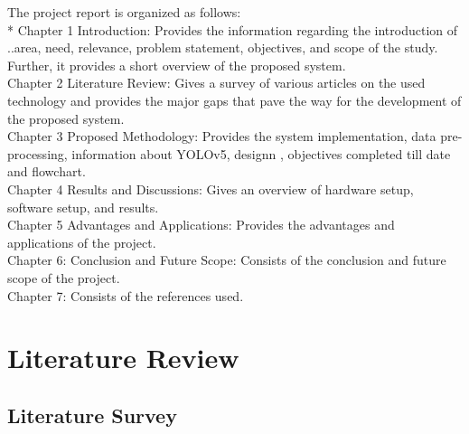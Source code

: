 \documentclass[12pt,a4paper]{report}
\begin{document}
\par The project report is organized as follows:
\\* Chapter 1 Introduction: Provides the information regarding the introduction of ..area, need, relevance, problem statement, objectives, and scope of the study. Further, it provides a short overview of the proposed system.
\\
Chapter 2 Literature Review: Gives a survey of various articles on the used technology and provides the major gaps that pave the way for the development of the proposed system.
\\
Chapter 3 Proposed Methodology: Provides the system implementation, data pre-processing, information about YOLOv5, designn , objectives completed till date and  flowchart.
\\
Chapter 4 Results and Discussions: Gives an overview of hardware setup, software setup, and results.  
\\
Chapter 5 Advantages and Applications: Provides the advantages and applications of the project. 
\\
Chapter 6: Conclusion and Future Scope: Consists of the conclusion and future scope of the project.
\\
Chapter 7: Consists of the references used.



\chapter{Literature Review}





 
\section {Literature Survey}
\end{document}
